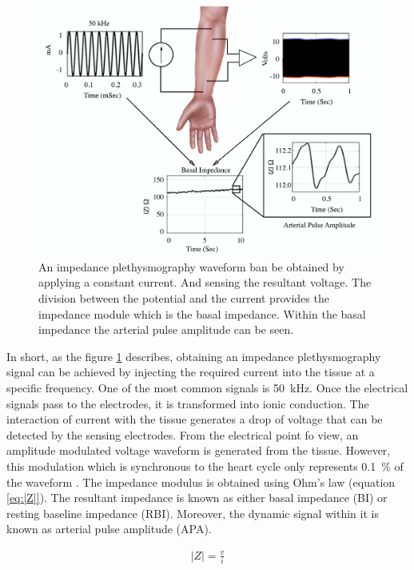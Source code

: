 \begin{figure}[!htpb]
	\centering
	\includegraphics[width=\textwidth,keepaspectratio]{figure15}    
	\caption[How to get an impedance plethysmography waveform]{An impedance plethysmography waveform ban be obtained by applying a constant current. And sensing the resultant voltage. The division between the potential and the current provides the impedance module which is the basal impedance. Within the basal impedance the arterial pulse amplitude can be seen.}
	\label{fig:envelope iPG}
\end{figure}

In short, as the figure \ref{fig:envelope iPG} describes, obtaining an impedance plethysmography signal can be achieved by injecting the required current into the tissue at a specific frequency. One of the most common signals is \SI{50}{\kilo\hertz}. Once the electrical signals pass to the electrodes,  it is transformed into ionic conduction. The interaction of current with the tissue generates a drop of voltage that can be detected by the sensing electrodes. From the electrical point fo view, an amplitude modulated voltage waveform is generated from the tissue. However, this modulation which is synchronous to the heart cycle only represents \SI{0.1}{\percent} of the waveform \cite{anderson1984impedance}. 
The impedance modulus is obtained using Ohm's law (equation \ref{eq:|Z|}). The resultant impedance is known as either basal impedance (BI) or resting baseline impedance (RBI). Moreover, the dynamic signal within it is known as arterial pulse amplitude (APA). 
 
 \begin{align}
 	\label{eq:|Z|}
 	\left| Z \right| = \frac{v}{i}
 \end{align}


